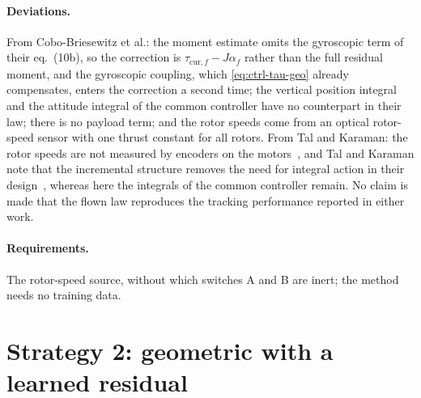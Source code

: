 \paragraph{Deviations.} From Cobo-Briesewitz et al.: the moment estimate omits the gyroscopic
term of their eq.~(10b), so the correction is $\tau_{\mathrm{cur},f} - J\alpha_f$ rather than the full
residual moment, and the gyroscopic coupling, which \eqref{eq:ctrl-tau-geo} already compensates,
enters the correction a second time; the vertical position integral and the attitude integral of
the common controller have no counterpart in their law; there is no payload term; and the rotor
speeds come from an optical rotor-speed sensor with one thrust constant for all rotors. From Tal and
Karaman: the rotor speeds are not measured by encoders on the motors~\cite{tal2018indi}, and Tal and
Karaman note that the incremental structure removes the need for integral action in their
design~\cite{tal2018indi}, whereas here the integrals of the common controller remain. No claim is
made that the flown law reproduces the tracking performance reported in either work.

\paragraph{Requirements.} The rotor-speed source, without which switches A and B are inert; the
method needs no training data.

\section{Strategy 2: geometric with a learned residual}
\label{sec:ctrl-s2}


